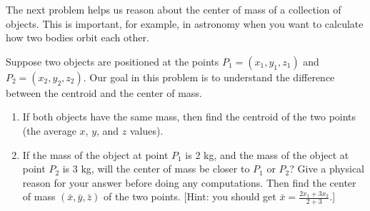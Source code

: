 The next problem helps us reason about the center of mass of a collection of objects.  This is important, for example, in astronomy when you want to calculate how two bodies orbit each other.

\begin{problem}%
 Suppose two objects are positioned at the points $P_1=(x_1,y_1,z_1)$ and $P_2=(x_2,y_2,z_2)$.
 Our goal in this problem is to understand the difference between the centroid and the center of mass.
\begin{enumerate}
 \item If both objects have the same mass, then find the centroid of the two points (the average $x$, $y$, and $z$ values).
 \item If the mass of the object at point $P_1$ is 2 kg, and the mass of the object at point $P_2$ is 3 kg, will the center of mass be closer to $P_1$ or $P_2$? Give a physical reason for your answer before doing any computations.  Then find the center of mass $(\bar x, \bar y, \bar z)$ of the two points. [Hint: you should get $\bar x= \frac{2x_1+3x_2}{2+3}$.] 
\end{enumerate}
\end{problem}


